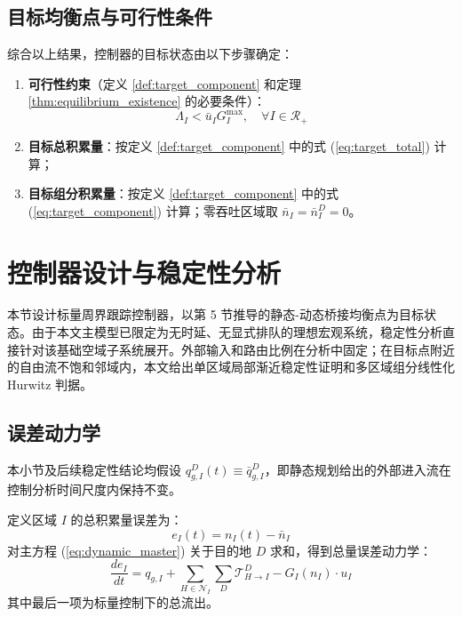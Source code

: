 \documentclass[a4paper,12pt]{article}
\theoremstyle{plain}
\theoremstyle{definition}
\theoremstyle{remark}
\begin{document}
\subsection{目标均衡点与可行性条件}

综合以上结果，控制器的目标状态由以下步骤确定：
\begin{enumerate}
    \item \textbf{可行性约束}（定义 \ref{def:target_component} 和定理 \ref{thm:equilibrium_existence} 的必要条件）：
    \begin{equation} \label{eq:feasibility}
        \Lambda_I < \bar u_I G_I^{\max}, \quad \forall I \in \mathcal{R}_+
    \end{equation}
    \item \textbf{目标总积累量}：按定义 \ref{def:target_component} 中的式 (\ref{eq:target_total}) 计算；
    \item \textbf{目标组分积累量}：按定义 \ref{def:target_component} 中的式 (\ref{eq:target_component}) 计算；零吞吐区域取 $\bar n_I=\bar n_I^D=0$。
\end{enumerate}

\section{控制器设计与稳定性分析}

本节设计标量周界跟踪控制器，以第 5 节推导的静态-动态桥接均衡点为目标状态。由于本文主模型已限定为无时延、无显式排队的理想宏观系统，稳定性分析直接针对该基础空域子系统展开。外部输入和路由比例在分析中固定；在目标点附近的自由流不饱和邻域内，本文给出单区域局部渐近稳定性证明和多区域组分线性化 Hurwitz 判据。

\subsection{误差动力学}

本小节及后续稳定性结论均假设 $q_{g,I}^D(t)\equiv\bar q_{g,I}^D$，即静态规划给出的外部进入流在控制分析时间尺度内保持不变。

定义区域 $I$ 的总积累量误差为：
\begin{equation}\label{eq:error_def}
    e_I(t) = n_I(t) - \bar{n}_I
\end{equation}
对主方程 (\ref{eq:dynamic_master}) 关于目的地 $D$ 求和，得到总量误差动力学：
\begin{equation}\label{eq:error_dynamics}
    \frac{de_I}{dt} = q_{g,I} + \sum_{H \in \mathcal{N}_I} \sum_D \mathcal{T}_{H \to I}^D - G_I(n_I) \cdot u_I
\end{equation}
其中最后一项为标量控制下的总流出。
\end{document}
